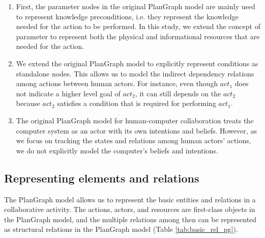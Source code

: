 \begin{enumerate}
 	\item First, the parameter nodes in the original PlanGraph model are mainly used to represent knowledge preconditions, i.e. they represent the knowledge needed for the action to be performed. In this study, we extend the concept of parameter to represent both the physical and informational resources that are needed for the action.
 	\item We extend the original PlanGraph model to explicitly represent conditions as standalone nodes. This allows us to model the indirect dependency relations among actions between human actors. For instance, even though $act_1$ does not indicate a higher level goal of $act_2$, it can still depends on the $act_2$ because $act_2$ satisfies a condition that is required for performing $act_1$.
 	\item The original PlanGraph model for human-computer collaboration treats the computer system as an actor with its own intentions and beliefs. However, as we focus on tracking the states and relations among human actors' actions, we do not explicitly model the computer's beliefs and intentions.
 \end{enumerate} 

\subsection{Representing elements and relations} %
\label{sub:representing_activities}
The PlanGraph model allows us to represent the basic entities and relations in a collaborative activity. The actions, actors, and resources are first-class objects in the PlanGraph model, and the multiple relations among then can be represented as structural relations in the PlanGraph model (Table \ref{tab:basic_rel_pg}). 


